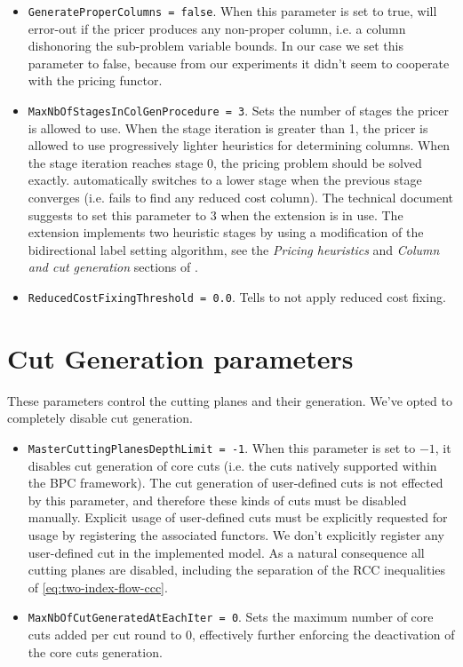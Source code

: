 \begin{itemize}
	\item \texttt{GenerateProperColumns = false}.
	      When this parameter is set to true, \bapcod{} will error-out if the pricer produces any non-proper column,
	      i.e. a column dishonoring the sub-problem variable bounds.
	      In our case we set this parameter to false,
	      because from our experiments it didn't seem to cooperate with the \vrpsolver{} pricing functor.
	\item \texttt{MaxNbOfStagesInColGenProcedure = 3}.
	      Sets the number of stages the pricer is allowed to use.
	      When the stage iteration is greater than 1, the pricer is allowed to use
	      progressively lighter heuristics for determining columns.
	      When the stage iteration reaches stage 0, the pricing problem should be solved exactly.
	      \bapcod{} automatically switches to a lower stage when the previous stage converges (i.e. fails to find any reduced cost column).
	      The technical document suggests to set this parameter to $3$ when the \vrpsolver{} extension is in use.
	      The \vrpsolver{} extension implements two heuristic stages by using a modification of the bidirectional label setting algorithm,
	      see the \textit{Pricing heuristics} and \textit{Column and cut generation} sections of \textcite{sadykov2021bucket}.
	\item \texttt{ReducedCostFixingThreshold = 0.0}.
	      Tells \bapcod{} to not apply reduced cost fixing.
\end{itemize}

\section{Cut Generation parameters}
These parameters control the cutting planes and their generation.
We've opted to completely disable cut generation.

\begin{itemize}
	\item \texttt{MasterCuttingPlanesDepthLimit = -1}.
	      When this parameter is set to $-1$, it disables cut generation of core cuts
	      (i.e. the cuts natively supported within the BPC framework).
	      The cut generation of user-defined cuts
	      is not effected by this parameter, and therefore these kinds of cuts must be disabled manually.
	      Explicit usage of user-defined cuts must be explicitly requested for usage
	      by registering the associated functors.
	      We don't explicitly register any user-defined cut in the implemented model.
	      As a natural consequence all cutting planes are disabled, including the separation of the RCC inequalities of \cref{eq:two-index-flow-ccc}.
	\item \texttt{MaxNbOfCutGeneratedAtEachIter = 0}.
	      Sets the maximum number of core cuts added per cut round to $0$,
	      effectively further enforcing the deactivation of the core cuts generation.
\end{itemize}

